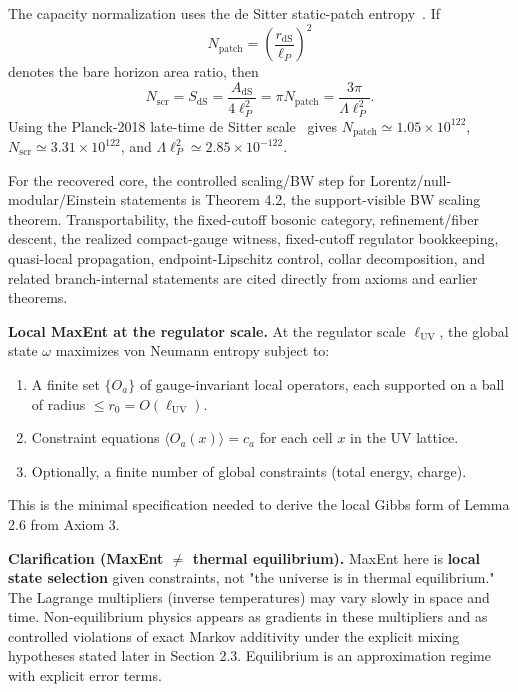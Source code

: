 The capacity normalization uses the de Sitter static-patch entropy~\cite{gibbonsHawking77}. If
\[
N_{\mathrm{patch}}=\left(\frac{r_{\mathrm{dS}}}{\ell_P}\right)^2
\]
denotes the bare horizon area ratio, then
\[
N_{\mathrm{scr}}=S_{\mathrm{dS}}=\frac{A_{\mathrm{dS}}}{4\ell_P^2}
=\pi N_{\mathrm{patch}}
=\frac{3\pi}{\Lambda\ell_P^2}.
\]
Using the Planck-2018 late-time de Sitter scale~\cite{planck18} gives
\(N_{\mathrm{patch}}\simeq1.05\times10^{122}\),
\(N_{\mathrm{scr}}\simeq3.31\times10^{122}\), and
\(\Lambda\ell_P^2\simeq2.85\times10^{-122}\).

For the recovered core, the controlled scaling/BW step for Lorentz/null-modular/Einstein statements is Theorem 4.2, the support-visible BW scaling theorem. Transportability, the fixed-cutoff bosonic category, refinement/fiber descent, the realized compact-gauge witness, fixed-cutoff regulator bookkeeping, quasi-local propagation, endpoint-Lipschitz control, collar decomposition, and related branch-internal statements are cited directly from axioms and earlier theorems.

\textbf{Local MaxEnt at the regulator scale.} At the regulator scale \(\ell_{\mathrm{UV}}\), the global state \(\omega\) maximizes von Neumann entropy subject to:

\begin{enumerate}
\def\labelenumi{\arabic{enumi}.}
\tightlist
\item
  A finite set \(\{O_a\}\) of gauge-invariant local operators, each supported on a ball of radius \(\le r_0 = O(\ell_{\mathrm{UV}})\).
\item
  Constraint equations \(\langle O_a(x) \rangle = c_a\) for each cell \(x\) in the UV lattice.
\item
  Optionally, a finite number of global constraints (total energy, charge).
\end{enumerate}

This is the minimal specification needed to derive the local Gibbs form of Lemma 2.6 from Axiom 3.

\textbf{Clarification (MaxEnt \(\neq\) thermal equilibrium).} MaxEnt here is \textbf{local state selection} given constraints, not "the universe is in thermal equilibrium." The Lagrange multipliers (inverse temperatures) may vary slowly in space and time. Non-equilibrium physics appears as gradients in these multipliers and as controlled violations of exact Markov additivity under the explicit mixing hypotheses stated later in Section 2.3. Equilibrium is an approximation regime with explicit error terms.

